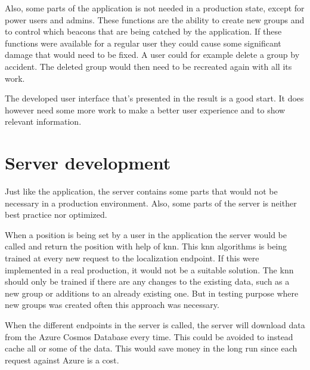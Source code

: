 \bigskip

Also, some parts of the application is not needed in a production state, except for power users and admins.
These functions are the ability to create new groups and to control which beacons that are being catched by the application.
If these functions were available for a regular user they could cause some significant damage that would need to be fixed.
A user could for example delete a group by accident.
The deleted group would then need to be recreated again with all its work. 

\bigskip

The developed user interface that's presented in the result is a good start.
It does however need some more work to make a better user experience and to show relevant information.


\section{Server development}\label{sec:}
Just like the application, the server contains some parts that would not be necessary in a production environment.
Also, some parts of the server is neither best practice nor optimized.

\bigskip

When a position is being set by a user in the application the server would be called and return the position with help of \acrfull{knn}.
This \acrshort{knn} algorithms is being trained at every new request to the localization endpoint.
If this were implemented in a real production, it would not be a suitable solution.
The \acrshort{knn} should only be trained if there are any changes to the existing data, such as a new group or additions to an already existing one.
But in testing purpose where new groups was created often this approach was necessary.

\bigskip

When the different endpoints in the server is called, the server will download data from the Azure Cosmos Database every time. 
This could be avoided to instead cache all or some of the data.
This would save money in the long run since each request against Azure is a cost.


